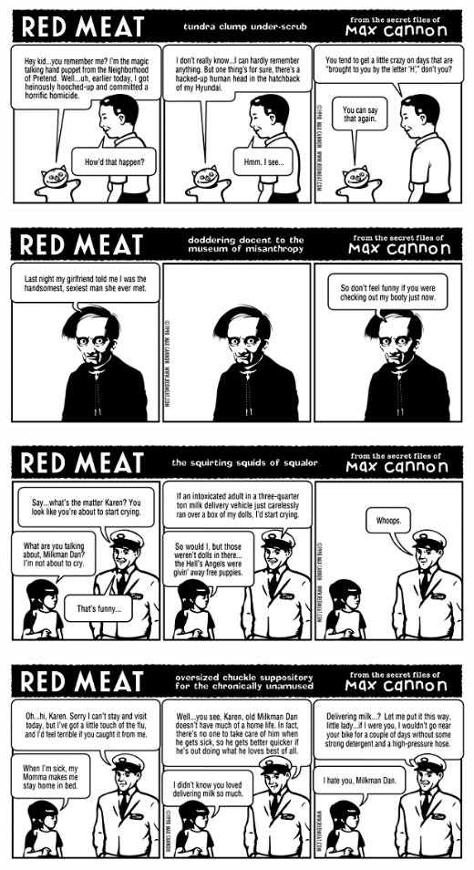 \documentclass[a4paper,twoside,11pt]{article}
\begin{document}
\includegraphics[width=\textwidth]{redmeat_1998-11-23.png}



\includegraphics[width=\textwidth]{redmeat_1998-11-30.png}



\includegraphics[width=\textwidth]{redmeat_1998-12-07.png}



\includegraphics[width=\textwidth]{redmeat_1998-12-14.png}
\end{document}
